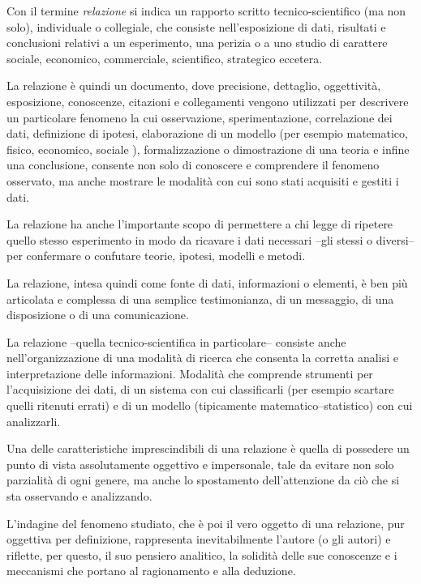 Con il termine \textit{relazione} si indica un rapporto scritto tecnico-scientifico (ma non solo), individuale o collegiale, che consiste nell'esposizione di dati, risultati e conclusioni relativi a un esperimento, una perizia o a uno studio di carattere sociale, economico, commerciale, scientifico, strategico eccetera.

La relazione è quindi un documento, dove precisione, dettaglio, oggettività, esposizione, conoscenze, citazioni e collegamenti vengono utilizzati per descrivere un particolare fenomeno la cui osservazione, sperimentazione, correlazione dei dati, definizione di ipotesi, elaborazione di un modello (per esempio matematico, fisico, economico, sociale \ecc), formalizzazione o dimostrazione di una teoria e infine una conclusione, consente non solo di conoscere e comprendere il fenomeno osservato, ma anche mostrare le modalità con cui sono stati acquisiti e gestiti i dati.

La relazione ha anche l'importante scopo di permettere a chi legge di ripetere quello stesso esperimento in modo da ricavare i dati necessari --gli stessi o diversi-- per confermare o confutare teorie, ipotesi, modelli e metodi.

La relazione, intesa quindi come fonte di dati, informazioni o elementi, è ben più articolata e complessa di una semplice testimonianza, di un messaggio, di una disposizione o di una comunicazione.

La relazione --quella tecnico-scientifica in particolare-- consiste anche nell'organizzazione di una modalità di ricerca che consenta la corretta analisi e interpretazione delle informazioni. Modalità che comprende strumenti per l'acquisizione dei dati, di un sistema con cui classificarli (per esempio scartare quelli ritenuti errati) e di un modello (tipicamente matematico--statistico) con cui analizzarli.

Una delle caratteristiche imprescindibili di una relazione è quella di possedere un punto di vista assolutamente oggettivo e impersonale, tale da evitare non solo parzialità di ogni genere, ma anche lo spostamento dell'attenzione da ciò che si sta osservando e analizzando.

L'indagine del fenomeno studiato, che è poi il vero oggetto di una relazione, pur oggettiva per definizione, rappresenta inevitabilmente l'autore (o gli autori) e riflette, per questo, il suo pensiero analitico, la solidità delle sue conoscenze e i meccanismi che portano al ragionamento e alla deduzione.



